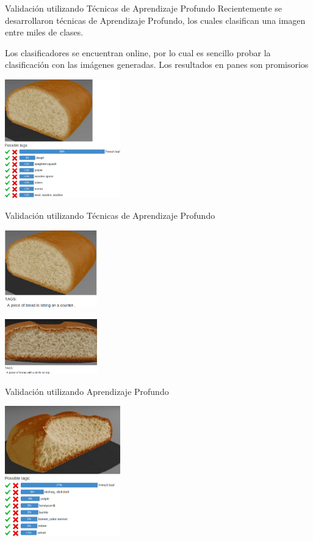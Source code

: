 \documentclass[spanish]{beamer}
\begin{document}
\begin{frame}{Validación utilizando Técnicas de Aprendizaje Profundo}
Recientemente se desarrollaron técnicas de Aprendizaje Profundo, los cuales clasifican una imagen entre miles de clases.

Los clasificadores se encuentran online, por lo cual es sencillo probar la clasificación con las imágenes generadas. Los resultados en panes son promisorios

\centerline{\includegraphics[width=5cm]{../figures/deep1}}

\end{frame}

\begin{frame}{Validación utilizando Técnicas de Aprendizaje Profundo}

\centerline{\includegraphics[width=4cm]{../figures/deep2}}
\centerline{\includegraphics[width=4cm]{../figures/deep3}}
\end{frame}
\begin{frame}{Validación utilizando Aprendizaje Profundo}
\centerline{\includegraphics[width=5cm]{../figures/deep4}}

\end{frame}
\end{document}
